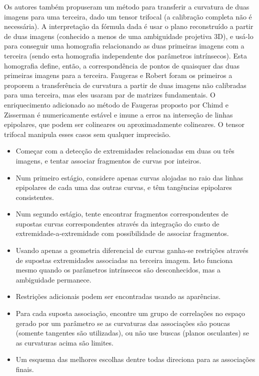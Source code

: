 
Os autores também propuseram um método para transferir a curvatura de duas imagens para uma terceira, dado um tensor trifocal (a calibração completa não é necessária). A interpretação da fórmula dada é usar o plano reconstruído a partir de duas imagens (conhecido a menos de uma ambiguidade projetiva 3D), e usá-lo para conseguir uma homografia relacionando as duas primeiras imagens com a terceira (sendo esta homografia independente dos parâmetros intrínsecos). Esta homografia define, então, a correspondência de pontos de quaisquer das duas primeiras imagens para a terceira. Faugeras e Robert foram os primeiros a proporem a transferência de curvatura a partir de duas imagens não calibradas para uma terceira, mas eles usaram par de matrizes fundamentais. O enriquecimento adicionado ao método de Faugeras proposto por Chimd e Zisserman é numericamente estável e imune a erros na interseção de linhas epipolares, que podem ser colineares ou aproximadamente colineares. O tensor trifocal manipula esses casos sem qualquer imprecisão.\\


\begin{itemize}
\item Começar com a detecção de extremidades relacionadas em duas ou três imagens, e tentar associar fragmentos de curvas por inteiros.
\item Num primeiro estágio, considere apenas curvas alojadas no raio das linhas epipolares de cada uma das outras curvas, e têm tangências epipolares consistentes.
\item Num segundo estágio, tente encontrar fragmentos correspondentes de supostas curvas correspondentes através da integração do custo de extremidade-a-extremidade com possibilidade de associar fragmentos.
\item Usando apenas a geometria diferencial de curvas ganha-se restrições através de supostas extremidades associadas na terceira imagem. Isto funciona mesmo quando os parâmetros intrínsecos são desconhecidos, mas a ambiguidade permanece.
\item Restrições adicionais podem ser encontradas usando as aparências.
\item Para cada suposta associação, encontre um grupo de correlações no espaço gerado por um parâmetro se as curvaturas das associações são poucas (somente tangentes são utilizadas), ou não use buscas (planos osculantes) se as curvaturas acima são limites.
\item Um esquema das melhores escolhas dentre todas direciona para as associações finais.
\end{itemize}




